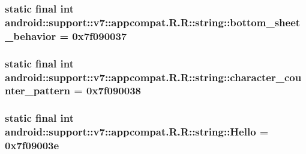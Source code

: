 \hypertarget{classandroid_1_1support_1_1v7_1_1appcompat_1_1_r_1_1string_4b4b886dcd6a1dcbf030e236e1c50e91}{
\subsubsection[{bottom\_\-sheet\_\-behavior}]{\setlength{\rightskip}{0pt plus 5cm}static final int android::support::v7::appcompat.R.R::string::bottom\_\-sheet\_\-behavior = 0x7f090037}}
\label{classandroid_1_1support_1_1v7_1_1appcompat_1_1_r_1_1string_4b4b886dcd6a1dcbf030e236e1c50e91}


\hypertarget{classandroid_1_1support_1_1v7_1_1appcompat_1_1_r_1_1string_c2437375ed9d2b50a209d2f6fe3ee7b9}{
\subsubsection[{character\_\-counter\_\-pattern}]{\setlength{\rightskip}{0pt plus 5cm}static final int android::support::v7::appcompat.R.R::string::character\_\-counter\_\-pattern = 0x7f090038}}
\label{classandroid_1_1support_1_1v7_1_1appcompat_1_1_r_1_1string_c2437375ed9d2b50a209d2f6fe3ee7b9}


\hypertarget{classandroid_1_1support_1_1v7_1_1appcompat_1_1_r_1_1string_642b4ddcf5f4e1a113fba280be3b4888}{
\subsubsection[{Hello}]{\setlength{\rightskip}{0pt plus 5cm}static final int android::support::v7::appcompat.R.R::string::Hello = 0x7f09003e}}
\label{classandroid_1_1support_1_1v7_1_1appcompat_1_1_r_1_1string_642b4ddcf5f4e1a113fba280be3b4888}


